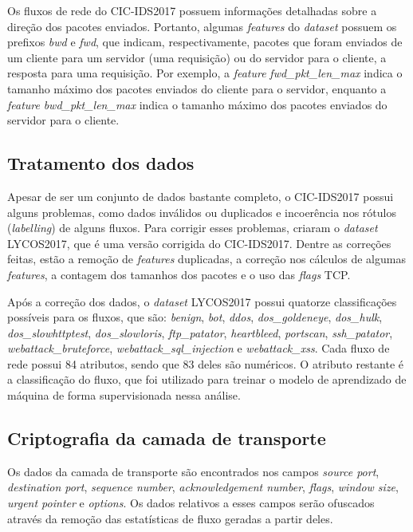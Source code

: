 \documentclass[12pt]{article}
\begin{document}
Os fluxos de rede do CIC-IDS2017 possuem informações detalhadas sobre a direção dos pacotes enviados. Portanto, algumas \textit{features} do \emph{dataset} possuem os prefixos \textit{bwd} e \textit{fwd}, que indicam, respectivamente, pacotes que foram enviados de um cliente para um servidor (uma requisição) ou do servidor para o cliente, a resposta para uma requisição. Por exemplo, a \textit{feature} \textit{fwd\_pkt\_len\_max} indica o tamanho máximo dos pacotes enviados do cliente para o servidor, enquanto a \textit{feature} \textit{bwd\_pkt\_len\_max} indica o tamanho máximo dos pacotes enviados do servidor para o cliente.

\subsection{Tratamento dos dados}
\label{sec:tratamento}

Apesar de ser um conjunto de dados bastante completo, o CIC-IDS2017 possui alguns problemas, como dados inválidos ou duplicados e incoerência nos rótulos (\emph{labelling}) de alguns fluxos. Para corrigir esses problemas, \cite{rosay2021cic} criaram o \emph{dataset} LYCOS2017, que é uma versão corrigida do CIC-IDS2017. Dentre as correções feitas, estão a remoção de \emph{features} duplicadas, a correção nos cálculos de algumas \emph{features}, a contagem dos tamanhos dos pacotes e o uso das \textit{flags} TCP.

Após a correção dos dados, o \emph{dataset} LYCOS2017 possui quatorze classificações possíveis para os fluxos, que são: \emph{benign}, \emph{bot}, \emph{ddos}, \emph{dos\_goldeneye}, \emph{dos\_hulk}, \emph{dos\_slowhttptest}, \emph{dos\_slowloris}, \emph{ftp\_patator}, \emph{heartbleed}, \emph{portscan}, \emph{ssh\_patator}, \emph{webattack\_bruteforce}, \emph{webattack\_sql\_injection} e \emph{webattack\_xss}. Cada fluxo de rede possui 84 atributos, sendo que 83 deles são numéricos. O atributo restante é a classificação do fluxo, que foi utilizado para treinar o modelo de aprendizado de máquina de forma supervisionada nessa análise.

\subsection{Criptografia da camada de transporte}
\label{sec:criptografia}

Os dados da camada de transporte são encontrados nos campos \emph{source port}, \emph{destination port}, \emph{sequence number}, \emph{acknowledgement number}, \emph{flags}, \emph{window size}, \emph{urgent pointer} e \emph{options}. Os dados relativos a esses campos serão ofuscados através da remoção das estatísticas de fluxo geradas a partir deles.
\end{document}
